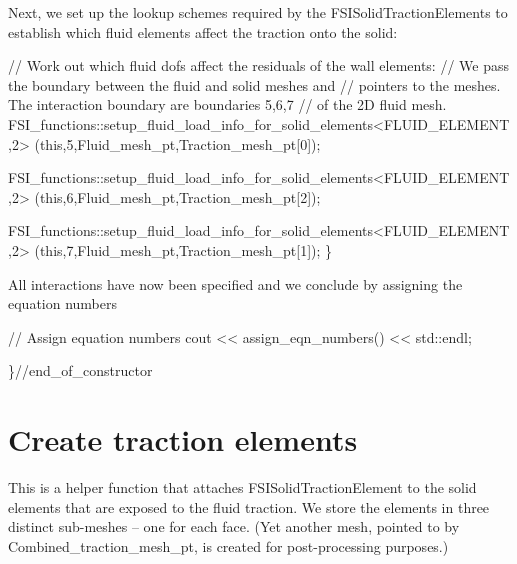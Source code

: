 Next, we set up the lookup schemes required by the {\ttfamily F\+S\+I\+Solid\+Traction\+Elements} to establish which fluid elements affect the traction onto the solid\+:


\begin{DoxyCodeInclude}
  
   \textcolor{comment}{// Work out which fluid dofs affect the residuals of the wall elements:}
   \textcolor{comment}{// We pass the boundary between the fluid and solid meshes and }
   \textcolor{comment}{// pointers to the meshes. The interaction boundary are boundaries 5,6,7}
   \textcolor{comment}{// of the 2D fluid mesh.}
   FSI\_functions::setup\_fluid\_load\_info\_for\_solid\_elements<FLUID\_ELEMENT,2>
    (\textcolor{keyword}{this},5,Fluid\_mesh\_pt,Traction\_mesh\_pt[0]);  
   
   FSI\_functions::setup\_fluid\_load\_info\_for\_solid\_elements<FLUID\_ELEMENT,2>
    (\textcolor{keyword}{this},6,Fluid\_mesh\_pt,Traction\_mesh\_pt[2]);  
   
   FSI\_functions::setup\_fluid\_load\_info\_for\_solid\_elements<FLUID\_ELEMENT,2>
    (\textcolor{keyword}{this},7,Fluid\_mesh\_pt,Traction\_mesh\_pt[1]); 
  \} 

\end{DoxyCodeInclude}


All interactions have now been specified and we conclude by assigning the equation numbers


\begin{DoxyCodeInclude}
 \textcolor{comment}{// Assign equation numbers}
 cout << assign\_eqn\_numbers() << std::endl; 


\}\textcolor{comment}{//end\_of\_constructor}

\end{DoxyCodeInclude}




 

\hypertarget{index_set_traction}{}\section{Create traction elements}\label{index_set_traction}
This is a helper function that attaches {\ttfamily F\+S\+I\+Solid\+Traction\+Element} to the solid elements that are exposed to the fluid traction. We store the elements in three distinct sub-\/meshes -- one for each face. (Yet another mesh, pointed to by {\ttfamily Combined\+\_\+traction\+\_\+mesh\+\_\+pt}, is created for post-\/processing purposes.)


